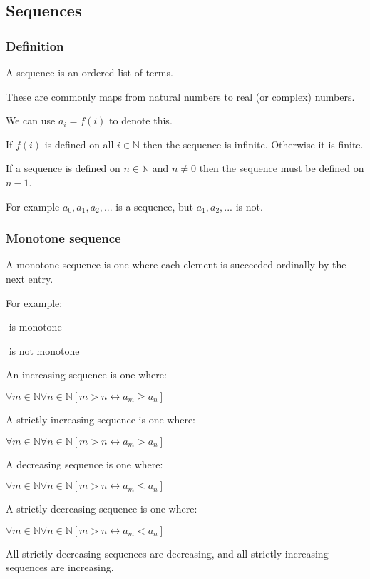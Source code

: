 
\subsection{Sequences}

\subsubsection{Definition}

A sequence is an ordered list of terms.

These are commonly maps from natural numbers to real (or complex) numbers.

We can use \(a_i=f(i)\) to denote this.

If \(f(i)\) is defined on all \(i\in \mathbb{N}\) then the sequence is infinite. Otherwise it is finite.

If a sequence is defined on \(n\in \mathbb{N}\) and \(n\ne 0\) then the sequence must be defined on \(n-1\).

For example \(a_0, a_1, a_2,...\) is a sequence, but \(a_1,a_2,...\) is not.

\subsubsection{Monotone sequence}

A monotone sequence is one where each element is succeeded ordinally by the next entry.

For example:

\(<1,2,3,6,7>\) is monotone

\(<1,2,3,3,4>\) is not monotone

An increasing sequence is one where:

$\forall m \in \mathbb{N} \forall n\in \mathbb{N} [m > n \leftrightarrow a_m \ge a_n]$

A strictly increasing sequence is one where:

$\forall m \in \mathbb{N} \forall n\in \mathbb{N} [m > n \leftrightarrow a_m > a_n]$

A decreasing sequence is one where:

$\forall m \in \mathbb{N} \forall n\in \mathbb{N} [m > n \leftrightarrow a_m \le a_n]$

A strictly decreasing sequence is one where:

$\forall m \in \mathbb{N} \forall n\in \mathbb{N} [m > n \leftrightarrow a_m < a_n]$

All strictly decreasing sequences are decreasing, and all strictly increasing sequences are increasing.

